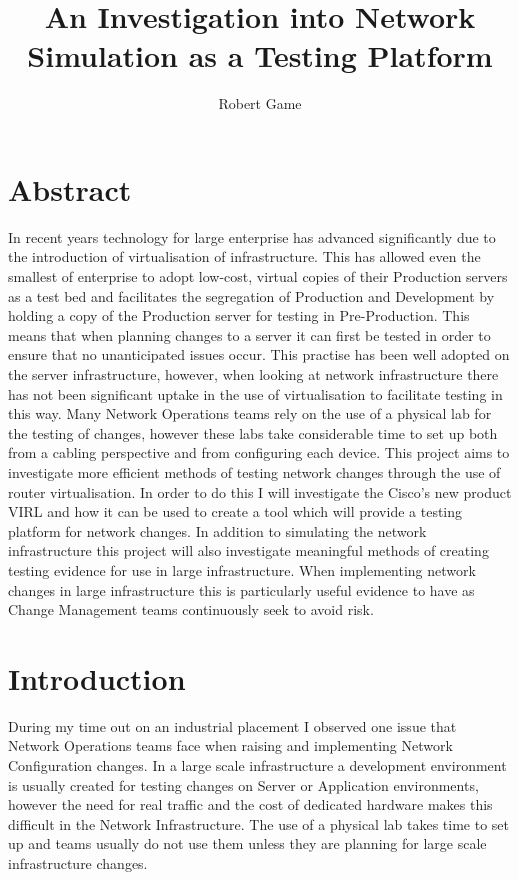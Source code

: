 \documentclass[11pt]{report}
\begin{document}
\title{An Investigation into Network Simulation as a Testing Platform}
\author{Robert Game}
\date{}
\maketitle

\chapter*{Abstract}

In recent years technology for large enterprise has advanced significantly due to the introduction of virtualisation of infrastructure. This has allowed even the smallest of enterprise to adopt low-cost, virtual copies of their Production servers as a test bed and facilitates the segregation of Production and Development by holding a copy of the Production server for testing in Pre-Production. This means that when planning changes to a server it can first be tested in order to ensure that no unanticipated issues occur. This practise has been well adopted on the server infrastructure, however, when looking at network infrastructure there has not been significant uptake in the use of virtualisation to facilitate testing in this way. Many Network Operations teams rely on the use of a physical lab for the testing of changes, however these labs take considerable time to set up both from a cabling perspective and from configuring each device. This project aims to investigate more efficient methods of testing network changes through the use of router virtualisation. In order to do this I will investigate the Cisco's new product VIRL and how it can be used to create a tool which will provide a testing platform for network changes. In addition to simulating the network infrastructure this project will also investigate meaningful methods of creating testing evidence for use in large infrastructure. When implementing network changes in large infrastructure this is particularly useful evidence to have as Change Management teams continuously seek to avoid risk.

\pagebreak

\tableofcontents

\chapter{Introduction}

During my time out on an industrial placement I observed one issue that Network Operations teams face when raising and implementing Network Configuration changes. In a large scale infrastructure a development environment is usually created for testing changes on Server or Application environments, however the need for real traffic and the cost of dedicated hardware makes this difficult in the Network Infrastructure. The use of a physical lab takes time to set up and teams usually do not use them unless they are planning for large scale infrastructure changes.
\end{document}
